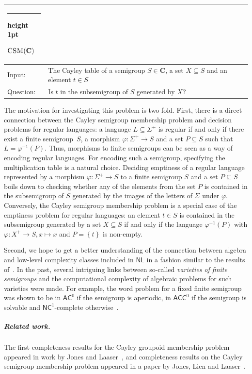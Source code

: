 \documentclass{toc}
\makeatletter
\newcommand{\os}[1]{\ensuremath{\left\{#1\right\}}}
\newcommand{\AC}{\ensuremath{\mathsf{AC}}}
\newcommand{\ACC}{\ensuremath{\mathsf{ACC}}}
\newcommand{\NC}{\ensuremath{\mathsf{NC}}}
\newcommand{\NL}{\ensuremath{\mathsf{NL}}}
\newcommand{\vC}{\mathbf{C}}
\newcommand{\CSM}{\ensuremath{\textsc{CSM}}}
\newcommand{\SCGM}{Cayley groupoid membership}
\newcommand{\SCSM}{Cayley semigroup membership}
\newcommand{\SCGMP}{{\SCGM} problem}
\newcommand{\SCSMP}{{\SCSM} problem}
\newcommand{\thickhline}{%
    \noalign {\ifnum 0=`}\fi \hrule height 1pt
    \futurelet \reserved@a \@xhline
}
\makeatother
\begin{document}
\noindent
\begin{tabularx}{\textwidth}{p{1.25cm}X}
  \thickhline
  $\CSM(\vC)$ \\
  \hline
  \textsf{Input}: & The Cayley table of a semigroup $S \in \vC$, a set $X \subseteq S$ and an element $t \in S$ \\
  \textsf{Question}: & Is $t$ in the subsemigroup of $S$ generated by $X$? \\
  \hline
\end{tabularx}
\vspace{1ex}

The motivation for investigating this problem is two-fold.
%
%
First,   %
there is a direct connection between the {\SCSMP} and decision
problems for regular languages: a language $L \subseteq \Sigma^+$ is regular
if and only if there exist a finite semigroup~$S$, a morphism $\varphi \colon
\Sigma^+ \to S$ and a set $P \subseteq S$ such that $L = \varphi^{-1}(P)$.
%
Thus, morphisms to finite semigroups can be seen as a way of encoding regular
languages. For encoding such a semigroup, specifying the multiplication table
is a natural choice.
%
Deciding emptiness of a regular language represented by a morphism $\varphi
\colon \Sigma^+ \to S$ to a finite semigroup $S$ and a set $P \subseteq S$
boils down to checking whether any of the elements from the set $P$ is
contained in the subsemigroup of $S$ generated by the images of the letters of
$\Sigma$ under $\varphi$.
%
Conversely, the {\SCSMP} is a special case of the emptiness problem for regular
languages: an element $t \in S$ is contained in the subsemigroup generated by a
set $X \subseteq S$ if and only if the language $\varphi^{-1}(P)$ with $\varphi
\colon X^+ \to S, x \mapsto x$ and $P = \os{t}$ is non-empty.

%
Second,  %
we hope to get a better understanding of the connection between
algebra and low-level complexity classes included in $\NL$ in a fashion 
similar to the results of~\cite{BarringtonM91}.
%
In the past, several intriguing links between so-called \emph{varieties
of finite semigroups} and the computational complexity of algebraic problems
for such varieties were made.
%
For example, the word problem for a fixed finite semigroup was shown to be in
$\AC^0$ if the semigroup is aperiodic, in $\ACC^0$ if the semigroup is solvable
and $\NC^1$-complete otherwise~\cite{Barrington89,bt88jacm}.

\subparagraph{Related work.}

%
The first %
completeness results for the {\SCGMP} appeared in work by Jones and
Laaser~\cite{JonesL76}, and completeness results on the {\SCSMP} appeared in a
paper by Jones, Lien and Laaser~\cite{JonesLL76}.
\end{document}
